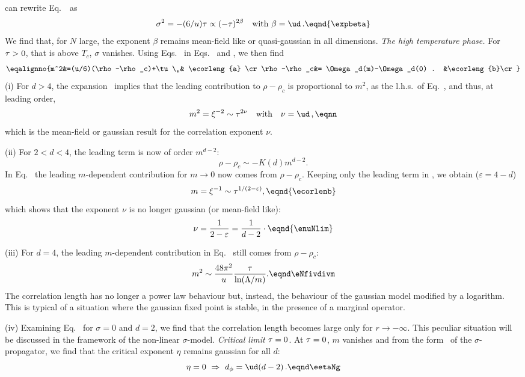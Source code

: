 can rewrite Eq.~\esponmag\ as
$$ \sigma^2=- (6/u)\tu\propto  (-\tu)^{2\beta}\quad {\rm with} \
\beta=\ud\, .\eqnd{\expbeta} $$
We find that, for $ N $ large, the exponent $\beta $ remains mean-field like or quasi-gaussian in all dimensions.
\medskip
{\it The high temperature phase.} For $\tau>0$,  that is above $ T_c $, $ \sigma $
vanishes.
Using Eqs.~\eqns{\eONrhoc,\eTmTc} in Eqs.~ and , we then find
\eqna\ecorleng
$$\eqalignno{m^2&=(u/6)(\rho-\rho_c)+\tu\,,& \ecorleng{a} \cr
\rho-\rho_c&= \Omega_d(m)-\Omega_d(0) . &\ecorleng{b}\cr} $$
\smallskip
(i) For $ d>4 $,  the expansion \etadepolii\ implies that the leading
contribution to  $\rho-\rho_c$  is proportional to $m^2$,
as the l.h.s.~of Eq.~, and thus,  at leading order,
$$ m^2=\xi^{-2}\sim \tu^{2\nu} \quad  {\rm with} \quad \nu =\ud\,,
\eqnn $$
which is the mean-field or gaussian result for the correlation exponent $\nu$. \par
(ii) For $ 2<d<4 $,   the leading term is now of order $m^{d-2}$:
$$\rho-\rho_c\sim -K(d)m^{d-2}. $$
In Eq.~ the leading $m$-dependent contribution  for $m\to 0$
now comes from $\rho-\rho_c$. Keeping only the
leading term in  \etadepolii, we obtain ($\varepsilon=4-d$)
$$ m=\xi^{-1}\sim \tu^{1/(2-\varepsilon)}, \eqnd{\ecorlenb} $$ which
shows that the exponent $ \nu $ is no longer gaussian (or mean-field like):
$$ \nu ={1 \over 2-\varepsilon} ={1 \over d-2}\cdot \eqnd{\enuNlim}
$$
\par
(iii) For $d=4$, the leading $m$-dependent contribution in Eq.~ still comes from $\rho-\rho_c$:
$$m^2 \sim {48\pi^2\over u} {\tau \over \ln(\Lambda /m)}.\eqnd\eNfivdivm $$
The correlation length has no longer  a power law behaviour but, instead, the behaviour of the gaussian model  modified by a logarithm. This is typical of a situation
where the gaussian fixed point is stable, in the presence of a marginal operator. \par
(iv) Examining Eq.~\esaddleN{c} for $\sigma=0$ and $d=2$,  we find
that the correlation length becomes large only for $r\to-\infty$.
This peculiar situation will be discussed in the framework of the
non-linear  $\sigma$-model.
\smallskip
{\it Critical limit $\tau=0$}. At $\tau=0$, $m$ vanishes and
from the form \eDeltasigN\ of the $\sigma$-propagator, we find that
the critical exponent $\eta$ remains gaussian for all $d$:
$$\eta=0\ \Rightarrow \ d_\phi=\ud(d-2)\,.\eqnd\eetaNg$$
